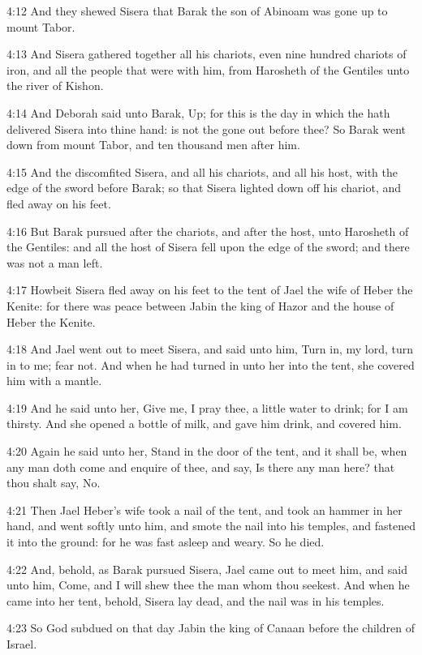 4:12 And they shewed Sisera that Barak the son of Abinoam was gone up to mount Tabor.

4:13 And Sisera gathered together all his chariots, even nine hundred chariots of iron, and all the people that were with him, from Harosheth of the Gentiles unto the river of Kishon.

4:14 And Deborah said unto Barak, Up; for this is the day in which the \LORD hath delivered Sisera into thine hand: is not the \LORD gone out before thee? So Barak went down from mount Tabor, and ten thousand men after him.

4:15 And the \LORD discomfited Sisera, and all his chariots, and all his host, with the edge of the sword before Barak; so that Sisera lighted down off his chariot, and fled away on his feet.

4:16 But Barak pursued after the chariots, and after the host, unto Harosheth of the Gentiles: and all the host of Sisera fell upon the edge of the sword; and there was not a man left.

4:17 Howbeit Sisera fled away on his feet to the tent of Jael the wife of Heber the Kenite: for there was peace between Jabin the king of Hazor and the house of Heber the Kenite.

4:18 And Jael went out to meet Sisera, and said unto him, Turn in, my lord, turn in to me; fear not. And when he had turned in unto her into the tent, she covered him with a mantle.

4:19 And he said unto her, Give me, I pray thee, a little water to drink; for I am thirsty. And she opened a bottle of milk, and gave him drink, and covered him.

4:20 Again he said unto her, Stand in the door of the tent, and it shall be, when any man doth come and enquire of thee, and say, Is there any man here? that thou shalt say, No.

4:21 Then Jael Heber's wife took a nail of the tent, and took an hammer in her hand, and went softly unto him, and smote the nail into his temples, and fastened it into the ground: for he was fast asleep and weary. So he died.

4:22 And, behold, as Barak pursued Sisera, Jael came out to meet him, and said unto him, Come, and I will shew thee the man whom thou seekest. And when he came into her tent, behold, Sisera lay dead, and the nail was in his temples.

4:23 So God subdued on that day Jabin the king of Canaan before the children of Israel.

